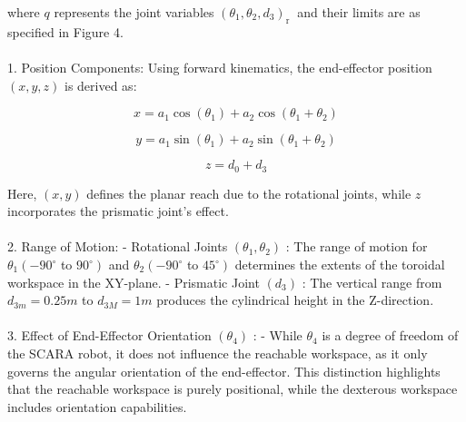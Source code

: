 \documentclass[12pt]{report}
\begin{document}
where $q$ represents the joint variables $\left(\theta_1, \theta_2, d_3\right)_{\text {r }}$ and their limits are as specified in Figure 4.
\\\\1. Position Components: Using forward kinematics, the end-effector position $(x, y, z)$ is derived as:


\begin{equation}
	x = a_1 \cos\left(\theta_1\right) + a_2 \cos\left(\theta_1 + \theta_2\right)
\end{equation}

\begin{equation}
	y = a_1 \sin\left(\theta_1\right) + a_2 \sin\left(\theta_1 + \theta_2\right)
\end{equation}

\begin{equation}
	z = d_0 + d_3
\end{equation}


Here, $(x, y)$ defines the planar reach due to the rotational joints, while $z$ incorporates the prismatic joint's effect.
\\\\2. Range of Motion:
- Rotational Joints $\left(\theta_1, \theta_2\right)$ : The range of motion for $\theta_1\left(-90^{\circ}\right.$ to $\left.90^{\circ}\right)$ and $\theta_2\left(-90^{\circ}\right.$ to $\left.45^{\circ}\right)$ determines the extents of the toroidal workspace in the XY-plane.
- Prismatic Joint $\left(d_3\right)$ : The vertical range from $d_{3 m}=0.25 m$ to $d_{3 M}=1 m$ produces the cylindrical height in the Z-direction.
\\\\3. Effect of End-Effector Orientation $\left(\theta_4\right)$ :
- While $\theta_4$ is a degree of freedom of the SCARA robot, it does not influence the reachable workspace, as it only governs the angular orientation of the end-effector. This distinction highlights that the reachable workspace is purely positional, while the dexterous workspace includes orientation capabilities.
\end{document}
